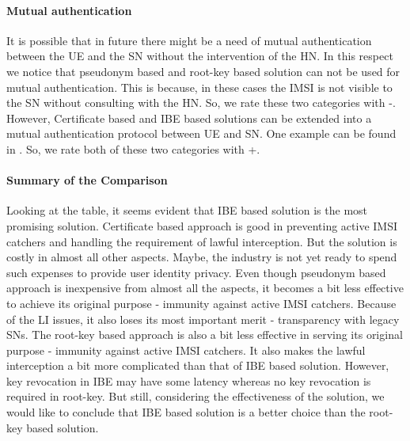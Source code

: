 \documentclass[conference]{IEEEtran}
\begin{document}
\paragraph{Mutual authentication} It is possible that in future there might be a need of mutual authentication between the UE and the SN without the intervention of the HN. In this respect we notice that pseudonym based and root-key based solution can not be used for mutual authentication. This is because, in these cases the IMSI is not visible to the SN without consulting with the HN. So, we rate these two categories with -. However, Certificate based and IBE based solutions can be extended into a mutual authentication protocol between UE and SN. One example can be found in \cite{ICTJournal}. So, we rate both of these two categories with +.
   

\paragraph{Summary of the Comparison}
Looking at the table, it seems evident that IBE based solution is the most promising solution. Certificate based approach is good in preventing active IMSI catchers and handling the requirement of lawful interception. But the solution is costly in almost all other aspects. Maybe, the industry is not yet ready to spend such expenses to provide user identity privacy. Even though pseudonym based approach is inexpensive from almost all the aspects, it becomes a bit less effective to achieve its original purpose - immunity against active IMSI catchers. Because of the LI issues, it also loses its most important merit - transparency with legacy SNs. The root-key based approach is also a bit less effective in serving its original purpose - immunity against active IMSI catchers. It also makes the lawful interception a bit more complicated than that of IBE based solution. However, key revocation in IBE may have some latency whereas no key revocation is required in root-key. But still, considering the effectiveness of the solution, we would like to conclude that IBE based solution is a better choice than the root-key based solution.
\end{document}
